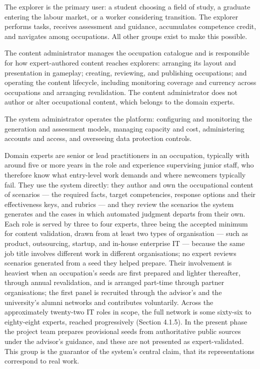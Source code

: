 The explorer is the primary user: a student choosing a field of study, a graduate entering the labour market, or a worker considering transition. The explorer performs tasks, receives assessment and guidance, accumulates competence credit, and navigates among occupations. All other groups exist to make this possible.

The content administrator manages the occupation catalogue and is responsible for how expert-authored content reaches explorers: arranging its layout and presentation in gameplay; creating, reviewing, and publishing occupations; and operating the content lifecycle, including monitoring coverage and currency across occupations and arranging revalidation. The content administrator does not author or alter occupational content, which belongs to the domain experts.

The system administrator operates the platform: configuring and monitoring the generation and assessment models, managing capacity and cost, administering accounts and access, and overseeing data protection controls.

Domain experts are senior or lead practitioners in an occupation, typically with around five or more years in the role and experience supervising junior staff, who therefore know what entry-level work demands and where newcomers typically fail. They use the system directly: they author and own the occupational content of scenarios --- the required facts, target competencies, response options and their effectiveness keys, and rubrics --- and they review the scenarios the system generates and the cases in which automated judgment departs from their own. Each role is served by three to four experts, three being the accepted minimum for content validation\cite{r69}, drawn from at least two types of organisation --- such as product, outsourcing, startup, and in-house enterprise IT --- because the same job title involves different work in different organisations; no expert reviews scenarios generated from a seed they helped prepare. Their involvement is heaviest when an occupation's seeds are first prepared and lighter thereafter, through annual revalidation, and is arranged part-time through partner organisations; the first panel is recruited through the advisor's and the university's alumni networks and contributes voluntarily. Across the approximately twenty-two IT roles in scope, the full network is some sixty-six to eighty-eight experts, reached progressively (Section 4.1.5). In the present phase the project team prepares provisional seeds from authoritative public sources under the advisor's guidance, and these are not presented as expert-validated. This group is the guarantor of the system's central claim, that its representations correspond to real work.

